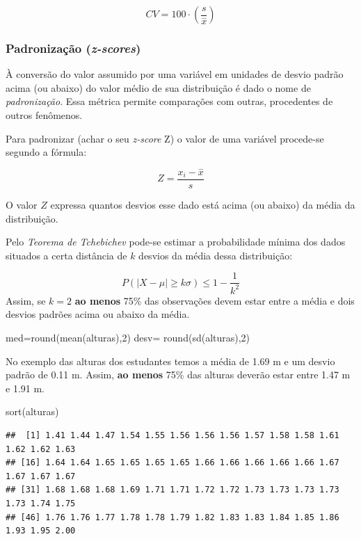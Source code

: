 \documentclass[
]{book}
\newenvironment{Shaded}{\begin{snugshade}}{\end{snugshade}}
\newcommand{\DecValTok}[1]{\textcolor[rgb]{0.00,0.00,0.81}{#1}}
\newcommand{\FunctionTok}[1]{\textcolor[rgb]{0.00,0.00,0.00}{#1}}
\newcommand{\NormalTok}[1]{#1}
\newcommand{\OtherTok}[1]{\textcolor[rgb]{0.56,0.35,0.01}{#1}}
\begin{document}
\[
CV= 100\cdot(\frac{s}{\stackrel{-}{x}})
\]

\hypertarget{padronizauxe7uxe3o-z-scores}{%
\subsubsection{\texorpdfstring{Padronização (\emph{z-scores})}{Padronização (z-scores)}}\label{padronizauxe7uxe3o-z-scores}}

À conversão do valor assumido por uma variável em unidades de desvio padrão acima (ou abaixo) do valor médio de sua distribuição é dado o nome de \emph{padronização}. Essa métrica permite comparações com outras, procedentes de outros fenômenos.

Para padronizar (achar o seu \emph{z-score} Z) o valor de uma variável procede-se segundo a fórmula:

\[
Z=\frac{x_{i} - \stackrel{-}{x}}{s}
\]

O valor \(Z\) expressa quantos desvios esse dado está acima (ou abaixo) da média da distribuição.

Pelo \emph{Teorema de Tchebichev} pode-se estimar a probabilidade mínima dos dados situados a certa distância de \(k\) desvios da média dessa distribuição:

\[
P(|X-\mu|\ge k\sigma) \leq 1 - \frac{1}{k^{2}}
\]
Assim, se \(k=2\) \textbf{ao menos} 75\% das observações devem estar entre a média e dois desvios padrões acima ou abaixo da média.

\begin{Shaded}
\begin{Highlighting}[]
\NormalTok{med}\OtherTok{=}\FunctionTok{round}\NormalTok{(}\FunctionTok{mean}\NormalTok{(alturas),}\DecValTok{2}\NormalTok{)}
\NormalTok{desv}\OtherTok{=} \FunctionTok{round}\NormalTok{(}\FunctionTok{sd}\NormalTok{(alturas),}\DecValTok{2}\NormalTok{)}
\end{Highlighting}
\end{Shaded}

No exemplo das alturas dos estudantes temos a média de 1.69 m e um desvio padrão de 0.11 m. Assim, \textbf{ao menos} 75\% das alturas deverão estar entre 1.47 m e 1.91 m.

\begin{Shaded}
\begin{Highlighting}[]
\FunctionTok{sort}\NormalTok{(alturas)}
\end{Highlighting}
\end{Shaded}

\begin{verbatim}
##  [1] 1.41 1.44 1.47 1.54 1.55 1.56 1.56 1.56 1.57 1.58 1.58 1.61 1.62 1.62 1.63
## [16] 1.64 1.64 1.65 1.65 1.65 1.65 1.66 1.66 1.66 1.66 1.66 1.67 1.67 1.67 1.67
## [31] 1.68 1.68 1.68 1.69 1.71 1.71 1.72 1.72 1.73 1.73 1.73 1.73 1.73 1.74 1.75
## [46] 1.76 1.76 1.77 1.78 1.78 1.79 1.82 1.83 1.83 1.84 1.85 1.86 1.93 1.95 2.00
\end{verbatim}
\end{document}
